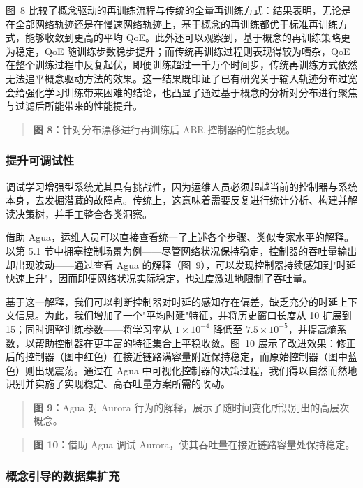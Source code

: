 \documentclass[11pt,a4paper]{article}
\begin{document}
图~8 比较了概念驱动的再训练流程与传统的全量再训练方式：结果表明，无论是在全部网络轨迹还是在慢速网络轨迹上，基于概念的再训练都优于标准再训练方式，能够收敛到更高的平均 QoE。此外还可以观察到，基于概念的再训练策略更为稳定，QoE 随训练步数稳步提升；而传统再训练过程则表现得较为嘈杂，QoE 在整个训练过程中反复起伏，即便训练超过一千万个时间步，传统再训练方式依然无法追平概念驱动方法的效果。这一结果既印证了已有研究关于输入轨迹分布过宽会给强化学习训练带来困难的结论，也凸显了通过基于概念的分析对分布进行聚焦与过滤后所能带来的性能提升。

\begin{quote}\small\noindent\textbf{图 8：}针对分布漂移进行再训练后 ABR 控制器的性能表现。\end{quote}

\subsubsection{提升可调试性}

调试学习增强型系统尤其具有挑战性，因为运维人员必须超越当前的控制器与系统本身，去发掘潜藏的故障点。传统上，这意味着需要反复进行统计分析、构建并解读决策树，并手工整合各类洞察。

借助 Agua，运维人员可以直接查看统一了上述各个步骤、类似专家水平的解释。以第 5.1 节中拥塞控制场景为例——尽管网络状况保持稳定，控制器的吞吐量输出却出现波动——通过查看 Agua 的解释（图~9），可以发现控制器持续感知到"时延快速上升"，因而即便网络状况实际稳定，也过度激进地限制了吞吐量。

基于这一解释，我们可以判断控制器对时延的感知存在偏差，缺乏充分的时延上下文信息。为此，我们增加了一个"平均时延"特征，并将历史窗口长度从 10 扩展到 15；同时调整训练参数——将学习率从 $1\times10^{-4}$ 降低至 $7.5\times10^{-5}$，并提高熵系数，以帮助控制器在更丰富的特征集合上平稳收敛。图~10 展示了改进效果：修正后的控制器（图中红色）在接近链路满容量附近保持稳定，而原始控制器（图中蓝色）则出现震荡。通过在 Agua 中可视化控制器的决策过程，我们得以自然而然地识别并实施了实现稳定、高吞吐量方案所需的改动。

\begin{quote}\small\noindent\textbf{图 9：}Agua 对 Aurora 行为的解释，展示了随时间变化所识别出的高层次概念。\end{quote}

\begin{quote}\small\noindent\textbf{图 10：}借助 Agua 调试 Aurora，使其吞吐量在接近链路容量处保持稳定。\end{quote}

\subsubsection{概念引导的数据集扩充}
\end{document}
